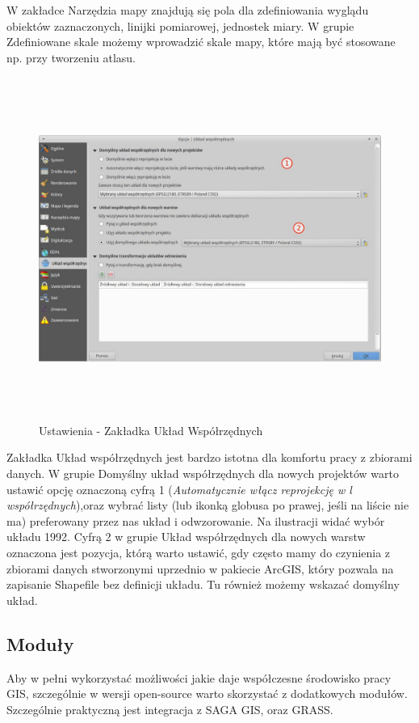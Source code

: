 \documentclass[12pt,a4paper]{book}
\begin{document}
W zakładce Narzędzia mapy znajdują się pola dla zdefiniowania wyglądu obiektów zaznaczonych, linijki pomiarowej, jednostek miary. W grupie Zdefiniowane skale możemy wprowadzić skale mapy, które mają być stosowane np. przy tworzeniu atlasu.


\begin{center}
\begin{figure}
\includegraphics[width=16.997cm,height=11.19cm]{002-zakladka-uklad.jpg}
\caption{Ustawienia - Zakładka Układ Współrzędnych}
\end{figure}
\end{center}
Zakładka Układ współrzędnych jest bardzo istotna dla komfortu pracy z zbiorami danych. W grupie Domyślny układ współrzędnych dla nowych projektów warto ustawić opcję oznaczoną cyfrą 1 (\textit{Automatycznie włącz reprojekcję w l} \textit{współrzędnych}),oraz wybrać listy (lub ikonką globusa po prawej, jeśli na liście nie ma) preferowany przez nas układ i odwzorowanie. Na ilustracji widać wybór układu 1992. Cyfrą 2 w grupie Układ współrzędnych dla nowych warstw oznaczona jest pozycja, którą warto ustawić, gdy często mamy do czynienia z zbiorami danych stworzonymi uprzednio w pakiecie ArcGIS, który pozwala na zapisanie Shapefile bez definicji układu. Tu również możemy wskazać domyślny układ.

\subsection{Moduły}
Aby w pełni wykorzystać możliwości jakie daje współczesne środowisko pracy GIS, szczególnie w wersji open-source warto skorzystać z dodatkowych modułów. Szczególnie praktyczną jest integracja z SAGA GIS, oraz GRASS.
\end{document}
